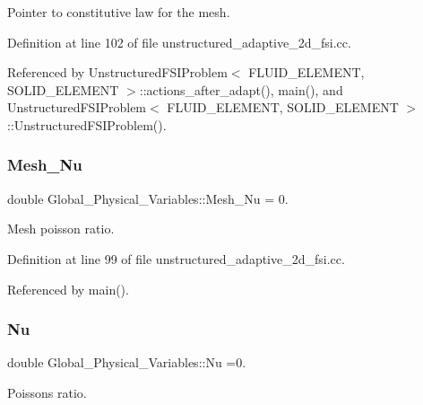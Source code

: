 Pointer to constitutive law for the mesh. 



Definition at line 102 of file unstructured\+\_\+adaptive\+\_\+2d\+\_\+fsi.\+cc.



Referenced by Unstructured\+F\+S\+I\+Problem$<$ F\+L\+U\+I\+D\+\_\+\+E\+L\+E\+M\+E\+N\+T, S\+O\+L\+I\+D\+\_\+\+E\+L\+E\+M\+E\+N\+T $>$\+::actions\+\_\+after\+\_\+adapt(), main(), and Unstructured\+F\+S\+I\+Problem$<$ F\+L\+U\+I\+D\+\_\+\+E\+L\+E\+M\+E\+N\+T, S\+O\+L\+I\+D\+\_\+\+E\+L\+E\+M\+E\+N\+T $>$\+::\+Unstructured\+F\+S\+I\+Problem().

\mbox{\label{namespaceGlobal__Physical__Variables_a0f1535b448627cbfa0acfb742120d96f}} 
\subsubsection{\texorpdfstring{Mesh\+\_\+\+Nu}{Mesh\_Nu}}
{\footnotesize\ttfamily double Global\+\_\+\+Physical\+\_\+\+Variables\+::\+Mesh\+\_\+\+Nu = 0.}



Mesh poisson ratio. 



Definition at line 99 of file unstructured\+\_\+adaptive\+\_\+2d\+\_\+fsi.\+cc.



Referenced by main().

\mbox{\label{namespaceGlobal__Physical__Variables_a3962c36313826b19f216f6bbbdd6a477}} 
\subsubsection{\texorpdfstring{Nu}{Nu}}
{\footnotesize\ttfamily double Global\+\_\+\+Physical\+\_\+\+Variables\+::\+Nu =0.}



Poisson\textquotesingle{}s ratio. 



